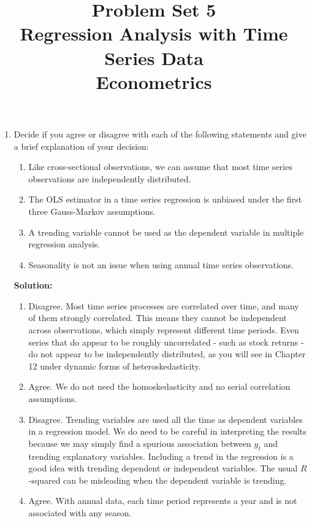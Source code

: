 \documentclass[12pt]{article}
\author{\empty}
\title{Problem Set 5\\Regression Analysis with Time Series Data\\Econometrics}
\date{\empty}
\begin{document}
	\maketitle
	
\begin{enumerate}
	
\item Decide if you agree or disagree with each of the following statements and give a brief explanation of your decision: 
\begin{enumerate}
    \item Like cross-sectional observations, we can assume that most time series observations are independently distributed.
\item The OLS estimator in a time series regression is unbiased under the first three Gauss-Markov assumptions.
\item A trending variable cannot be used as the dependent variable in multiple regression analysis.
\item Seasonality is not an issue when using annual time series observations.
\end{enumerate}



{\color{blue}
\noindent \textbf{Solution:}

\begin{enumerate}
    \item Disagree. Most time series processes are correlated over time, and many of them strongly correlated. This means they cannot be independent across observations, which simply represent different time periods. Even series that do appear to be roughly uncorrelated - such as stock returns - do not appear to be independently distributed, as you will see in Chapter 12 under dynamic forms of heteroskedasticity.
 \item Agree. We do not need the homoskedasticity and no serial correlation assumptions.
 \item Disagree. Trending variables are used all the time as dependent variables in a regression model. We do need to be careful in interpreting the results because we may simply find a spurious association between $y_t$ and trending explanatory variables. Including a trend in the regression is a good idea with trending dependent or independent variables. The usual $R$-squared can be misleading when the dependent variable is trending.
 \item Agree. With annual data, each time period represents a year and is not associated with any season.
\end{enumerate}
}


\end{enumerate}
\end{document}
